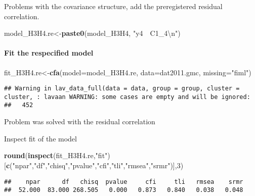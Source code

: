 \documentclass[
]{article}
\newenvironment{Shaded}{\begin{snugshade}}{\end{snugshade}}
\newcommand{\CharTok}[1]{\textcolor[rgb]{0.31,0.60,0.02}{#1}}
\newcommand{\DataTypeTok}[1]{\textcolor[rgb]{0.13,0.29,0.53}{#1}}
\newcommand{\DecValTok}[1]{\textcolor[rgb]{0.00,0.00,0.81}{#1}}
\newcommand{\KeywordTok}[1]{\textcolor[rgb]{0.13,0.29,0.53}{\textbf{#1}}}
\newcommand{\NormalTok}[1]{#1}
\newcommand{\StringTok}[1]{\textcolor[rgb]{0.31,0.60,0.02}{#1}}
\begin{document}
Problems with the covariance structure, add the preregistered residual
correlation.

\begin{Shaded}
\begin{Highlighting}[]
\NormalTok{model_H3H4.re<-}\KeywordTok{paste0}\NormalTok{(model_H3H4,}
                      \StringTok{"y4~~C1_4}\CharTok{\textbackslash{}n}\StringTok{"}\NormalTok{)}
\end{Highlighting}
\end{Shaded}

\hypertarget{fit-the-respecified-model-3}{%
\paragraph{Fit the respecified
model}\label{fit-the-respecified-model-3}}

\begin{Shaded}
\begin{Highlighting}[]
\NormalTok{fit_H3H4.re<-}\KeywordTok{cfa}\NormalTok{(}\DataTypeTok{model=}\NormalTok{model_H3H4.re,}
              \DataTypeTok{data=}\NormalTok{dat2011.gmc,}
              \DataTypeTok{missing=}\StringTok{"fiml"}\NormalTok{)}
\end{Highlighting}
\end{Shaded}

\begin{verbatim}
## Warning in lav_data_full(data = data, group = group, cluster = cluster, : lavaan WARNING: some cases are empty and will be ignored:
##   452
\end{verbatim}

Problem was solved with the residual correlation

Inspect fit of the model

\begin{Shaded}
\begin{Highlighting}[]
\KeywordTok{round}\NormalTok{(}\KeywordTok{inspect}\NormalTok{(fit_H3H4.re,}\StringTok{"fit"}\NormalTok{)}
\NormalTok{      [}\KeywordTok{c}\NormalTok{(}\StringTok{"npar"}\NormalTok{,}\StringTok{"df"}\NormalTok{,}\StringTok{"chisq"}\NormalTok{,}\StringTok{"pvalue"}\NormalTok{,}\StringTok{"cfi"}\NormalTok{,}\StringTok{"tli"}\NormalTok{,}\StringTok{"rmsea"}\NormalTok{,}\StringTok{"srmr"}\NormalTok{)],}\DecValTok{3}\NormalTok{)}
\end{Highlighting}
\end{Shaded}

\begin{verbatim}
##    npar      df   chisq  pvalue     cfi     tli   rmsea    srmr 
##  52.000  83.000 268.505   0.000   0.873   0.840   0.038   0.048
\end{verbatim}
\end{document}
